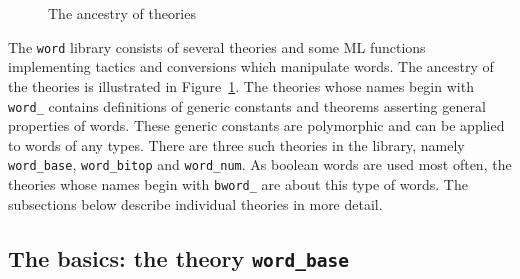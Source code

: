 \begin{figure}
\begin{center}

\end{center}
\caption{The ancestry of theories\label{fig-thy_hier}}
\end{figure}
The {\tt word} library consists of several theories and some ML
functions implementing tactics and conversions which manipulate words.
The ancestry of the theories is illustrated in
Figure~\ref{fig-thy_hier}. The theories whose names begin with {\tt
word\_} contains definitions of generic constants and theorems
asserting  general properties of words. These generic constants are
polymorphic and can be applied to words of any types.
There are three such theories in the library, namely {\tt word\_base},
{\tt word\_bitop} and {\tt word\_num}.
As boolean words are used most often, the theories whose names begin
with {\tt bword\_} are about this type of words. The subsections below
describe individual theories in more detail.

\subsection{The basics: the theory {\tt word\_base}}

